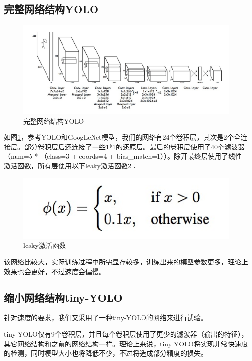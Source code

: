 {\subsection{完整网络结构YOLO}{
	\begin{figure}[htbp]
	\centering
	\includegraphics[width=5in]{images/net.png}
	\caption{完整网络结构YOLO}
	\label{net}
	\end{figure}
	如图\ref{net}，参考YOLO和GoogLeNet模型\cite{}，我们的网络有24个卷积层，其次是2个全连接层。部分卷积层后还连接了一些1*1的还原层。最后的卷积层使用了40个滤波器（num=5 * （class=3 + coords=4 + bias\_match=1））。除开最终层使用了线性激活函数，所有层使用以下leaky激活函数\ref{leaky}：
	\begin{figure}[htbp]
	\centering
	\includegraphics[width=5in]{images/leaky.png}
	\caption{leaky激活函数}
	\label{leaky}
	\end{figure}

	该网络比较大，实际训练过程中所需显存较多，训练出来的模型参数更多，理论上效果也会更好，不过速度会偏慢。
}

\subsection{缩小网络结构tiny-YOLO}{
	针对速度的要求，我们又采用了一种tiny-YOLO的网络来进行试验。

	tiny-YOLO仅有9个卷积层，并且每个卷积层使用了更少的滤波器（输出的特征），其它网络结构和之前的网络结构一样。理论上来说，tiny-YOLO将实现非常快速度的检测，同时模型大小也将降低不少，不过将造成部分精度的损失。
}
}

